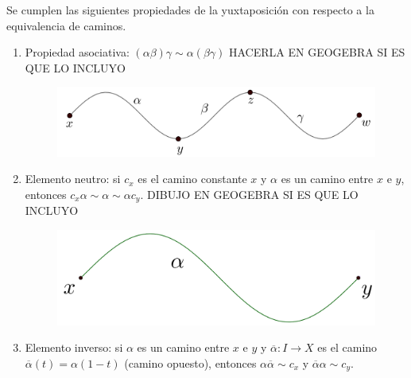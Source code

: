 \documentclass[bibtex, anon]{TEMat-article}
\begin{document}
\begin{proposicion} Se cumplen las siguientes propiedades de la yuxtaposición con respecto a la equivalencia de caminos.
	\begin{enumerate}
		\item Propiedad asociativa: $(\alpha\beta)\gamma\sim\alpha(\beta\gamma)$ HACERLA EN GEOGEBRA SI ES QUE LO INCLUYO
		\begin{figure}[h!]
			\centering
			\includegraphics[scale=0.2]{Imagenes/propi1}
		\end{figure}
		
		\item Elemento neutro: si $c_x$ es el camino constante $x$ y $\alpha$ es un camino entre $x$ e $y$, entonces  $c_x\alpha\sim\alpha\sim\alpha c_y$. DIBUJO EN GEOGEBRA SI ES QUE LO INCLUYO
		\begin{figure}[h!]
			\centering
			\includegraphics[scale=0.1]{Imagenes/propi2}
		\end{figure}
		\item Elemento inverso: si $\alpha$ es un camino entre $x$ e $y$ y $\overline{\alpha}:I\to X$ es el camino $\overline{\alpha}(t)=\alpha(1-t)$ (camino opuesto), entonces $\alpha\overline{\alpha}\sim c_x$ y $\overline{\alpha}\alpha\sim c_y$.
	\end{enumerate}
\end{proposicion}
\end{document}
